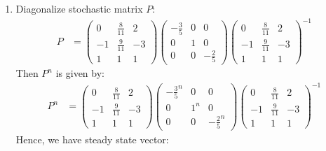 \documentclass[12pt, a4paper]{article}
\begin{document}
\begin{enumerate}[Q\arabic*.]
\begin{enumerate}[(\alph*)]
      \item Diagonalize stochastic matrix $P$:
        \begin{align*}
          P &= \left(\begin{array}{ccc} 0 & \frac{8}{11} & 2\\ -1 & \frac{9}{11} & -3\\ 1 & 1 & 1 \end{array}\right)\left(\begin{array}{ccc} -\frac{3}{5} & 0 & 0\\ 0 & 1 & 0\\ 0 & 0 & -\frac{2}{5} \end{array}\right)\left(\begin{array}{ccc} 0 & \frac{8}{11} & 2\\ -1 & \frac{9}{11} & -3\\ 1 & 1 & 1 \end{array}\right)^{-1}
        \end{align*}
        Then $P^n$ is given by:
        \begin{align*}
          P^n &= \left(\begin{array}{ccc} 0 & \frac{8}{11} & 2\\ -1 & \frac{9}{11} & -3\\ 1 & 1 & 1 \end{array}\right)\left(\begin{array}{ccc} -\frac{3}{5}^n & 0 & 0\\ 0 & 1^n & 0\\ 0 & 0 & -\frac{2}{5}^n \end{array}\right)\left(\begin{array}{ccc} 0 & \frac{8}{11} & 2\\ -1 & \frac{9}{11} & -3\\ 1 & 1 & 1 \end{array}\right)^{-1}
        \end{align*}
        Hence, we have steady state vector:
        \begin{align*}

\end{align*}
\end{enumerate}
\end{enumerate}
\end{document}
